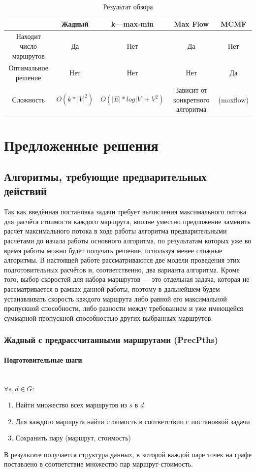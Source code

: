 \documentclass[a4paper]{article}
\begin{document}
\begin{table}[H]
\caption{Результат обзора}
\begin{center}
\begin{tabular}{|c|c|c|c|c|}
\hline
\ &  Жадный & k---max-min & Max Flow & MCMF \\
\hline
Находит число маршрутов & Да & Нет & Да & Нет \\
\hline
Оптимальное решение & Нет & Нет & Нет & Да \\
\hline
Сложность & $O(k*|V|^2)$ & $O(|E|*log|V| + V^2)$ & Зависит от конкретного алгоритма & (maxflow) \\
\hline
\end{tabular}
\end{center}
\end{table} 



\newpage
\section{Предложенные решения}
\subsection{Алгоритмы, требующие предварительных действий}
Так как введённая постановка задачи требует вычисления максимального потока для расчёта стоимости каждого маршрута, вполне уместно предложение заменить расчёт максимального потока в ходе работы алгоритма предварительными расчётами до начала работы основного алгоритма, по результатам которых уже во время работы можно будет получать решение, используя менее сложные алгоритмы. В настоящей работе рассматриваются две модели проведения этих подготовительных расчётов и, соответственно, два варианта алгоритма. 
Кроме того, выбор скоростей для набора маршрутов --- это отдельная задача, которая не рассматривается в рамках данной работы, поэтому в дальнейшем будем устанавливать скорость каждого маршрута либо равной его максимальной пропускной способности, либо разности между требованием и уже имеющейся суммарной пропускной способностью других выбранных маршрутов.

\subsubsection{Жадный с предрассчитанными маршрутами (PrecPths)} \label{pre_pth}
\paragraph{Подготовительные шаги}\mbox{}\\
$\forall s, d \in G: $
\begin{enumerate}
\item Найти множество всех маршрутов из $s$ в $d$
\item Для каждого маршрута найти стоимость в соответствии с постановкой задачи
\item Сохранить пару (маршрут, стоимость)
\end{enumerate}
В результате получается структура данных, в которой каждой паре точек на графе поставлено в соответствие множество пар маршрут-стоимость.
\end{document}
